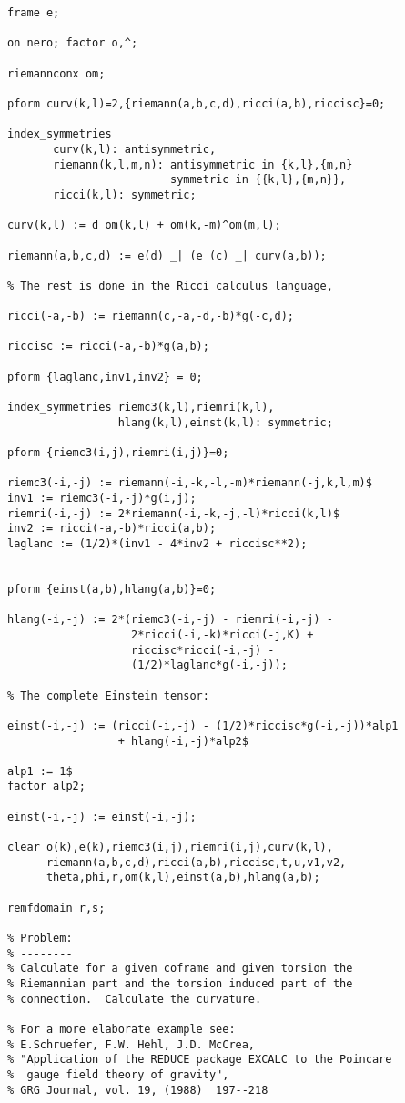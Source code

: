 {\begin{verbatim}
frame e;

on nero; factor o,^;

riemannconx om;

pform curv(k,l)=2,{riemann(a,b,c,d),ricci(a,b),riccisc}=0;

index_symmetries
       curv(k,l): antisymmetric,
       riemann(k,l,m,n): antisymmetric in {k,l},{m,n}
                         symmetric in {{k,l},{m,n}},
       ricci(k,l): symmetric;

curv(k,l) := d om(k,l) + om(k,-m)^om(m,l);

riemann(a,b,c,d) := e(d) _| (e (c) _| curv(a,b));

% The rest is done in the Ricci calculus language,

ricci(-a,-b) := riemann(c,-a,-d,-b)*g(-c,d);

riccisc := ricci(-a,-b)*g(a,b);

pform {laglanc,inv1,inv2} = 0;

index_symmetries riemc3(k,l),riemri(k,l),
                 hlang(k,l),einst(k,l): symmetric;

pform {riemc3(i,j),riemri(i,j)}=0;

riemc3(-i,-j) := riemann(-i,-k,-l,-m)*riemann(-j,k,l,m)$
inv1 := riemc3(-i,-j)*g(i,j);
riemri(-i,-j) := 2*riemann(-i,-k,-j,-l)*ricci(k,l)$
inv2 := ricci(-a,-b)*ricci(a,b);
laglanc := (1/2)*(inv1 - 4*inv2 + riccisc**2);


pform {einst(a,b),hlang(a,b)}=0;

hlang(-i,-j) := 2*(riemc3(-i,-j) - riemri(-i,-j) -
                   2*ricci(-i,-k)*ricci(-j,K) +
                   riccisc*ricci(-i,-j) - 
                   (1/2)*laglanc*g(-i,-j));

% The complete Einstein tensor:

einst(-i,-j) := (ricci(-i,-j) - (1/2)*riccisc*g(-i,-j))*alp1
                 + hlang(-i,-j)*alp2$

alp1 := 1$
factor alp2;

einst(-i,-j) := einst(-i,-j);

clear o(k),e(k),riemc3(i,j),riemri(i,j),curv(k,l),
      riemann(a,b,c,d),ricci(a,b),riccisc,t,u,v1,v2,
      theta,phi,r,om(k,l),einst(a,b),hlang(a,b);

remfdomain r,s;

% Problem:
% --------
% Calculate for a given coframe and given torsion the
% Riemannian part and the torsion induced part of the
% connection.  Calculate the curvature.

% For a more elaborate example see:
% E.Schruefer, F.W. Hehl, J.D. McCrea,
% "Application of the REDUCE package EXCALC to the Poincare
%  gauge field theory of gravity", 
% GRG Journal, vol. 19, (1988)  197--218


\end{verbatim}}

